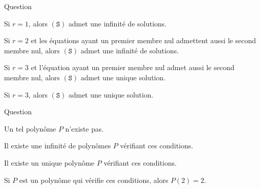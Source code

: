 \begin{multi}[multiple,feedback=
{D'après la méthode du pivot de Gauss, \((\mathtt{S})\) admet une solution si et seulement si toute équation de \((\mathtt{S}_E)\) dont le premier membre est nul a aussi son second membre nul.
}]{Question}
    \item Si \(r=1\), alors \((\mathtt{S})\) admet une infinité de solutions.
    \item* Si \(r=2\) et les équations ayant un premier membre nul admettent aussi le second membre nul, alors \((\mathtt{S})\) admet une infinité de solutions.
    \item* Si \(r=3\) et l'équation ayant un premier membre nul admet aussi le second membre nul, alors \((\mathtt{S})\) admet une unique solution.
    \item Si \(r=3\), alors \((\mathtt{S})\) admet une unique solution.
\end{multi}


\begin{multi}[multiple,feedback=
{On pose : \(P(X)=aX^3+bX^2+cX+d\), où \(a,b,c\) et \(d\) sont des réels à déterminer. En résolvant le système :
\[(\mathtt{S})  
\left\{\begin{array}{rcc}
P(1)&=&1\\
P(0)&=&1\\ 
P(-1)&=&-1\\
P'(1)&=&3 \\
\end{array}\right.
\Leftrightarrow  
\left\{\begin{array}{rcc}
a+b+c+d&=&1\\
d&=&1\\ 
-a+b-c+d&=&-1\\
3a+2b+c&=&3. \\
\end{array}\right. \]
On obtient : \(P(X)=2X^3-X^2-X+1\). Par conséquent il existe un unique polynôme vérifiant les conditions ci-dessus et \(P(2)=11\).
}]{Question}
    \item Un tel polynôme \(P\) n'existe pas.
    \item Il existe une infinité de polynômes \(P\) vérifiant ces conditions.
    \item* Il existe un unique polynôme \(P\)  vérifiant ces conditions.
    \item Si \(P\) est un polynôme qui vérifie ces conditions, alors \(P(2)=2\).
\end{multi}


